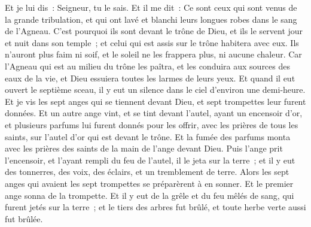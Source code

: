 \begin{multicols}{2}
Et je lui dis~: Seigneur, tu le sais. Et il me dit~: Ce sont ceux qui sont venus de la grande tribulation, et qui ont lavé et blanchi leurs longues robes dans le sang de l'Agneau.
C'est pourquoi ils sont devant le trône de Dieu, et ils le servent jour et nuit dans son temple~; et celui qui est assis sur le trône habitera avec eux.
Ils n'auront plus faim ni soif, et le soleil ne les frappera plus, ni aucune chaleur.
Car l'Agneau qui est au milieu du trône les paîtra, et les conduira aux sources des eaux de la vie, et Dieu essuiera toutes les larmes de leurs yeux.
\VerseOne{}Et quand il eut ouvert le septième sceau, il y eut un silence dans le ciel d'environ une demi-heure.
Et je vis les sept anges qui se tiennent devant Dieu, et sept trompettes leur furent données.
Et un autre ange vint, et se tint devant l'autel, ayant un encensoir d'or, et plusieurs parfums lui furent donnés pour les offrir, avec les prières de tous les saints, sur l'autel d'or qui est devant le trône.
Et la fumée des parfums monta avec les prières des saints de la main de l'ange devant Dieu.
Puis l'ange prit l'encensoir, et l'ayant rempli du feu de l'autel, il le jeta sur la terre~; et il y eut des tonnerres, des voix, des éclairs, et un tremblement de terre.
Alors les sept anges qui avaient les sept trompettes se préparèrent à en sonner.
Et le premier ange sonna de la trompette. Et il y eut de la grêle et du feu mêlés de sang, qui furent jetés sur la terre~; et le tiers des arbres fut brûlé, et toute herbe verte aussi fut brûlée.

\end{multicols}
